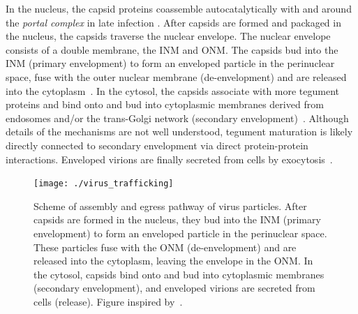In the nucleus, the \gls{capsid} proteins coassemble autocatalytically with and around the \emph{portal complex} in late infection \cite{[4]}.
After capsids are formed and packaged in the nucleus, the capsids %
traverse the nuclear envelope.
The nuclear envelope consists of a double membrane, the \gls{INM} and \gls{ONM}.
The \gls{capsid}s bud into the INM (primary envelopment) to form an enveloped particle in the perinuclear space, fuse with the outer nuclear membrane (de-envelopment) and are released into the cytoplasm~\cite{[12]}. %
In the cytosol, the capsids associate with more tegument proteins and bind onto and bud into cytoplasmic membranes derived from endosomes and/or the trans-Golgi network (secondary envelopment)~\cite{[13, 14]}.
Although details of the mechanisms are not well understood, tegument maturation is likely directly connected to secondary envelopment via direct protein-protein interactions.
Enveloped virions are finally secreted from cells by exocytosis~\cite{[15, 16]}.
%

\begin{landscape}
  \begin{figure}
  \centering
  \texttt{[image: ./virus\_trafficking]}
  \caption[Scheme of assembly and egress pathway of virus particles.]{Scheme of assembly and egress pathway of virus particles.
  After capsids are formed in the nucleus, they bud into the \gls{INM} (primary envelopment) to form an enveloped particle in the perinuclear space.
  These particles fuse with the \gls{ONM} (de-envelopment) and are released into the cytoplasm, leaving the envelope in the ONM.
  In the cytosol, capsids bind onto and bud into cytoplasmic membranes (secondary envelopment), and enveloped virions are secreted from cells (release).
  Figure inspired by~\cite{[2]}.}\label{fig:viral_egress}
  \end{figure}
\end{landscape}

